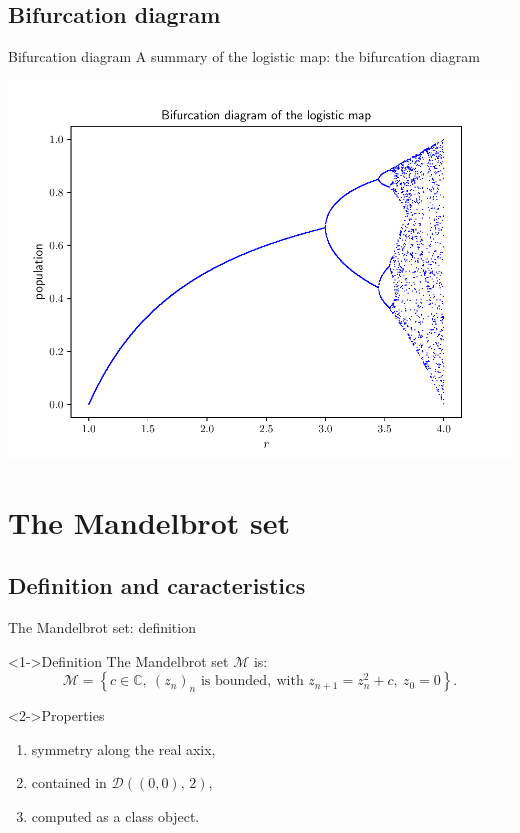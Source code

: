 \documentclass[11pt, compress, tikz]{beamer}
\theoremstyle{definition}
\begin{document}
\subsection{Bifurcation diagram}
\begin{frame}{Bifurcation diagram}
A summary of the logistic map: the bifurcation diagram
\begin{center}
    \includegraphics[scale=0.6]{bifurcation.pdf}
\end{center}
\end{frame}



\section[Mandelbrot]{The Mandelbrot set}
\subsection{Definition and caracteristics}


\begin{frame}{The Mandelbrot set: definition}



\begin{block}<1->{Definition}
The Mandelbrot set $\mathcal{M}$ is:
$$\mathcal{M}=\left\{ c\in\mathbb{C},\ (z_n)_n \text{ is bounded},\ \text{with } z_{n+1}=z_n^2+c,\ z_0=0\right\}.$$
\end{block}
\begin{block}<2->{Properties}
\begin{enumerate}[label=$\bullet$]
\item symmetry along the real axix,
\item contained in $\mathcal{D}((0,0),\, 2)$,
\item computed as a class object.
\end{enumerate}
\end{block}
\end{frame}
\end{document}
